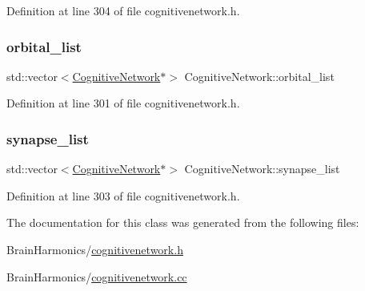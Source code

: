 Definition at line 304 of file cognitivenetwork.\+h.

\mbox{\label{class_cognitive_network_a263efd10857d5507c0e889e48f7329fe}} 
\subsubsection{\texorpdfstring{orbital\+\_\+list}{orbital\_list}}
{\footnotesize\ttfamily std\+::vector$<$\mbox{\hyperlink{class_cognitive_network}{Cognitive\+Network}}$\ast$$>$ Cognitive\+Network\+::orbital\+\_\+list\hspace{0.3cm}{\ttfamily [protected]}}



Definition at line 301 of file cognitivenetwork.\+h.

\mbox{\label{class_cognitive_network_a9218de9d63b10b313df289d1312c81e0}} 
\subsubsection{\texorpdfstring{synapse\+\_\+list}{synapse\_list}}
{\footnotesize\ttfamily std\+::vector$<$\mbox{\hyperlink{class_cognitive_network}{Cognitive\+Network}}$\ast$$>$ Cognitive\+Network\+::synapse\+\_\+list\hspace{0.3cm}{\ttfamily [protected]}}



Definition at line 303 of file cognitivenetwork.\+h.



The documentation for this class was generated from the following files\+:\begin{DoxyCompactItemize}
\item 
Brain\+Harmonics/\mbox{\hyperlink{cognitivenetwork_8h}{cognitivenetwork.\+h}}\item 
Brain\+Harmonics/\mbox{\hyperlink{cognitivenetwork_8cc}{cognitivenetwork.\+cc}}\end{DoxyCompactItemize}
